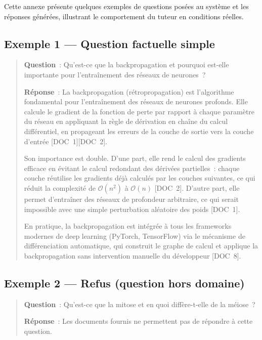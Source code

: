 \documentclass[11pt,a4paper]{article}
\begin{document}
Cette annexe présente quelques exemples de questions posées au système et les réponses générées, illustrant le comportement du tuteur en conditions réelles.

\subsection*{Exemple 1 --- Question factuelle simple}

\begin{quote}
\textbf{Question}~: Qu'est-ce que la backpropagation et pourquoi est-elle importante pour l'entraînement des réseaux de neurones~?

\textbf{Réponse}~: La backpropagation (rétropropagation) est l'algorithme fondamental pour l'entraînement des réseaux de neurones profonds. Elle calcule le gradient de la fonction de perte par rapport à chaque paramètre du réseau en appliquant la règle de dérivation en chaîne du calcul différentiel, en propageant les erreurs de la couche de sortie vers la couche d'entrée [DOC~1][DOC~2].

Son importance est double. D'une part, elle rend le calcul des gradients efficace en évitant le calcul redondant des dérivées partielles~: chaque couche réutilise les gradients déjà calculés par les couches suivantes, ce qui réduit la complexité de $\mathcal{O}(n^2)$ à $\mathcal{O}(n)$ [DOC~2]. D'autre part, elle permet d'entraîner des réseaux de profondeur arbitraire, ce qui serait impossible avec une simple perturbation aléatoire des poids [DOC~1].

En pratique, la backpropagation est intégrée à tous les frameworks modernes de deep learning (PyTorch, TensorFlow) via le mécanisme de différenciation automatique, qui construit le graphe de calcul et applique la backpropagation sans intervention manuelle du développeur [DOC~8].
\end{quote}

\subsection*{Exemple 2 --- Refus (question hors domaine)}

\begin{quote}
\textbf{Question}~: Qu'est-ce que la mitose et en quoi diffère-t-elle de la méiose~?

\textbf{Réponse}~: Les documents fournis ne permettent pas de répondre à cette question.
\end{quote}
\end{document}
